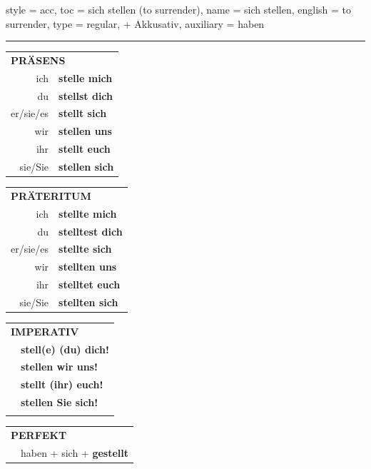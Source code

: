 \begin{verbentry}{
  style = {acc},
  toc = {sich stellen (to surrender)},
  name = {sich stellen},
  english = {to surrender},
  type = {regular, + Akkusativ},
  auxiliary = {haben}
}
 
    
       \vspace{5pt}

    \hrule
    
    \vspace{5pt}

  \begin{tabular}{rl}
     \multicolumn{2}{l}{\textbf{PRÄSENS} }\\
    ich & \textbf{stelle mich}\\
    du & \textbf{stellst dich}\\
    er/sie/es & \textbf{stellt sich}\\
    wir & \textbf{stellen uns}\\
    ihr & \textbf{stellt euch}\\
    sie/Sie & \textbf{stellen sich}\\
  \end{tabular}
  \hfill
     \begin{tabular}{rl}
    \multicolumn{2}{l}{\textbf{PRÄTERITUM} }\\
    ich & \textbf{stellte mich}\\
    du & \textbf{stelltest dich}\\
    er/sie/es & \textbf{stellte sich}\\
    wir & \textbf{stellten uns}\\
    ihr & \textbf{stelltet euch}\\
    sie/Sie & \textbf{stellten sich}\\
  \end{tabular}
  \hfill
  \begin{tabular}{rl}
     \multicolumn{2}{l}{\textbf{IMPERATIV} }\\
   & \textbf{stell(e) (du) dich!}\\
   & \textbf{stellen wir uns!}\\
   & \textbf{stellt (ihr) euch!}\\
   & \textbf{stellen Sie sich!}\\
   & \vspace{10pt}
  \end{tabular}

    \vspace{10pt}

 \begin{tabular}{rl}
     \multicolumn{2}{l}{\textbf{PERFEKT}}\\
    &haben + sich + \textbf{gestellt}\\
  \end{tabular}
\hfill
   \begin{tabular}{rl}
   

\end{tabular}
\end{verbentry}
